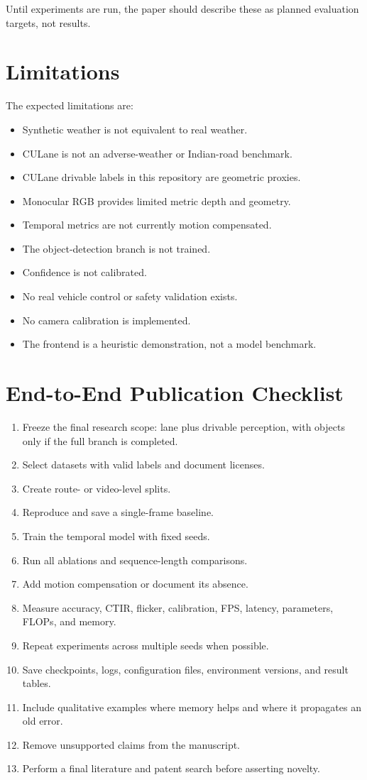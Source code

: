 \documentclass[11pt,a4paper]{article}
\begin{document}
Until experiments are run, the paper should describe these as planned evaluation targets, not results.

\section{Limitations}

The expected limitations are:
\begin{itemize}
\item Synthetic weather is not equivalent to real weather.
\item CULane is not an adverse-weather or Indian-road benchmark.
\item CULane drivable labels in this repository are geometric proxies.
\item Monocular RGB provides limited metric depth and geometry.
\item Temporal metrics are not currently motion compensated.
\item The object-detection branch is not trained.
\item Confidence is not calibrated.
\item No real vehicle control or safety validation exists.
\item No camera calibration is implemented.
\item The frontend is a heuristic demonstration, not a model benchmark.
\end{itemize}

\section{End-to-End Publication Checklist}

\begin{enumerate}
\item Freeze the final research scope: lane plus drivable perception, with objects only if the full branch is completed.
\item Select datasets with valid labels and document licenses.
\item Create route- or video-level splits.
\item Reproduce and save a single-frame baseline.
\item Train the temporal model with fixed seeds.
\item Run all ablations and sequence-length comparisons.
\item Add motion compensation or document its absence.
\item Measure accuracy, CTIR, flicker, calibration, FPS, latency, parameters, FLOPs, and memory.
\item Repeat experiments across multiple seeds when possible.
\item Save checkpoints, logs, configuration files, environment versions, and result tables.
\item Include qualitative examples where memory helps and where it propagates an old error.
\item Remove unsupported claims from the manuscript.
\item Perform a final literature and patent search before asserting novelty.
\end{enumerate}
\end{document}
